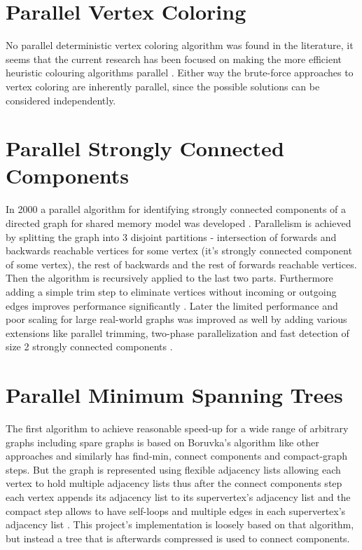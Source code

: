 \documentclass{report}
\theoremstyle{plain}
\theoremstyle{definition}
\theoremstyle{remark}
\begin{document}
\section{Parallel Vertex Coloring}

No parallel deterministic vertex coloring algorithm was found in the literature, it seems that the current research has been focused on making the more efficient heuristic colouring algorithms parallel \cite{gebremedhin1999parallel, gebremedhin2000scalable, jones1993parallel}. Either way the brute-force approaches to vertex coloring are inherently parallel, since the possible solutions can be considered independently.

\section{Parallel Strongly Connected Components}

In 2000 a parallel algorithm for identifying strongly connected components of a directed graph for shared memory model was developed \cite{fleischer2000identifying}. Parallelism is achieved by splitting the graph into 3 disjoint partitions - intersection of forwards and backwards reachable vertices for some vertex (it's strongly connected component of some vertex), the rest of backwards and the rest of forwards reachable vertices. Then the algorithm is recursively applied to the last two parts. Furthermore adding a simple trim step to eliminate vertices without incoming or outgoing edges improves performance significantly \cite{mclendon2005finding}. Later the limited performance and poor scaling for large real-world graphs was improved as well by adding various extensions like parallel trimming, two-phase parallelization and fast detection of size 2 strongly connected components \cite{hongtechnical}.

\section{Parallel Minimum Spanning Trees}
The first algorithm to achieve reasonable speed-up for a wide range of arbitrary graphs including spare graphs is based on Boruvka's algorithm like other approaches and similarly has find-min, connect components and compact-graph steps. But the graph is represented using flexible adjacency lists allowing each vertex to hold multiple adjacency lists thus after the connect components step each vertex appends its adjacency list to its supervertex's adjacency list and the compact step allows to have self-loops and multiple edges in each supervertex's adjacency list \cite{Bader20061366}. This project's implementation is loosely based on that algorithm, but instead a tree that is afterwards compressed is used to connect components.
\end{document}
